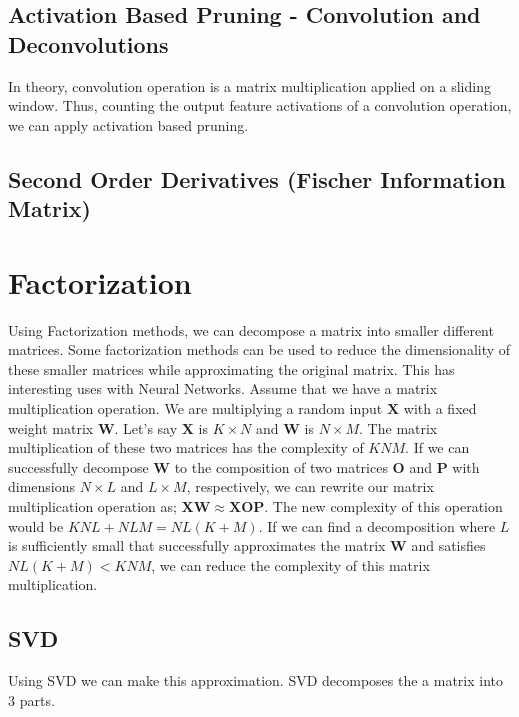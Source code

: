 \subsection{Activation Based Pruning - Convolution and Deconvolutions}
In theory, convolution operation is a matrix multiplication applied on a sliding window. Thus, counting the output feature activations of a convolution operation, we can apply activation based pruning. 

\subsection{Second Order Derivatives (Fischer Information Matrix)}

\section{Factorization}
Using Factorization methods, we can decompose a matrix into smaller different matrices. Some factorization methods can be used to reduce the dimensionality of these smaller matrices while approximating the original matrix. This has interesting uses with Neural Networks. Assume that we have a matrix multiplication operation. We are multiplying a random input $\mathbf{X}$ with a fixed weight matrix $\mathbf{W}$. Let's say $\mathbf{X}$ is $K \times N$ and $\mathbf{W}$ is $N \times M$. The matrix multiplication of these two matrices has the complexity of $KNM$. If we can successfully decompose $\mathbf{W}$ to the composition of two matrices $\mathbf{O}$ and $\mathbf{P}$ with dimensions $N \times L$ and $L \times M$, respectively, we can rewrite our matrix multiplication operation as; $\mathbf{X}\mathbf{W} \approx \mathbf{X}\mathbf{O}\mathbf{P}$. The new complexity of this operation would be $KNL + NLM = NL(K+M)$. If we can find a decomposition where $L$ is sufficiently small that successfully approximates the matrix $\mathbf{W}$ and satisfies $NL(K+M) < KNM$, we can reduce the complexity of this matrix multiplication.
\subsection{SVD}
Using SVD we can make this approximation. SVD decomposes the a matrix into 3 parts. 


